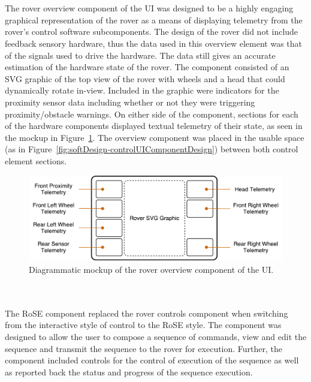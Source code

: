         \\\\
          The rover overview component of the UI was designed to be a highly engaging graphical representation of the rover as a means of displaying telemetry from the rover's control software subcomponents. The design of the rover did not include feedback sensory hardware, thus the data used in this overview element was that of the signals used to drive the hardware. The data still gives an accurate estimation of the hardware state of the rover. The component consisted of an SVG graphic of the top view of the rover with wheels and a head that could dynamically rotate in-view. Included in the graphic were indicators for the proximity sensor data including whether or not they were triggering proximity/obstacle warnings. On either side of the component, sections for each of the hardware components displayed textual telemetry of their state, as seen in the mockup in Figure~\ref{fig:softDesign-roverOverviewUIComponentDesign}. The overview component was placed in the usable space (as in Figure~\ref{fig:softDesign-controlUIComponentDesign}) between both control element sections.
        
          \begin{figure}[h!]
            \centering
            \includegraphics[width=0.7\linewidth]{figures/softDesign-roverOverviewUIComponentDesign}
            \caption[Diagrammatic mockup of the rover overview component of the UI.]{Diagrammatic mockup of the rover overview component of the UI.}
            \label{fig:softDesign-roverOverviewUIComponentDesign}
          \end{figure}
        
      \\\\
        The RoSE component replaced the rover controls component when switching from the interactive style of control to the RoSE style. The component was designed to allow the user to compose a sequence of commands, view and edit the sequence and transmit the sequence to the rover for execution. Further, the component included controls for the control of execution of the sequence as well as reported back the status and progress of the sequence execution.
        
